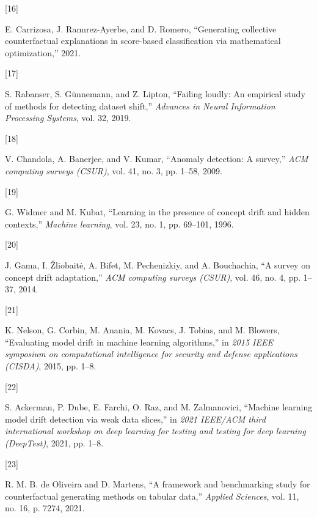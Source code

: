 \documentclass[
  conference]{IEEEtran}
\newlength{\cslhangindent}
\newlength{\csllabelwidth}
\newlength{\cslentryspacingunit} %
\newenvironment{CSLReferences}[2] %
 {%
  \setlength{\parindent}{0pt}
  \ifodd #1
  \let\oldpar\par
  \def\par{\hangindent=\cslhangindent\oldpar}
  \fi
  \setlength{\parskip}{#2\cslentryspacingunit}
 }%
 {}
\newcommand{\CSLLeftMargin}[1]{\parbox[t]{\csllabelwidth}{#1}}
\newcommand{\CSLRightInline}[1]{\parbox[t]{\linewidth - \csllabelwidth}{#1}\break}
\begin{document}
\begin{CSLReferences}{0}{0}
\leavevmode{}%
\CSLLeftMargin{{[}16{]} }%
\CSLRightInline{E. Carrizosa, J. Ramırez-Ayerbe, and D. Romero,
{``Generating collective counterfactual explanations in score-based
classification via mathematical optimization,''} 2021.}

\leavevmode{}%
\CSLLeftMargin{{[}17{]} }%
\CSLRightInline{S. Rabanser, S. Günnemann, and Z. Lipton, {``Failing
loudly: An empirical study of methods for detecting dataset shift,''}
\emph{Advances in Neural Information Processing Systems}, vol. 32,
2019.}

\leavevmode{}%
\CSLLeftMargin{{[}18{]} }%
\CSLRightInline{V. Chandola, A. Banerjee, and V. Kumar, {``Anomaly
detection: A survey,''} \emph{ACM computing surveys (CSUR)}, vol. 41,
no. 3, pp. 1--58, 2009.}

\leavevmode{}%
\CSLLeftMargin{{[}19{]} }%
\CSLRightInline{G. Widmer and M. Kubat, {``Learning in the presence of
concept drift and hidden contexts,''} \emph{Machine learning}, vol. 23,
no. 1, pp. 69--101, 1996.}

\leavevmode{}%
\CSLLeftMargin{{[}20{]} }%
\CSLRightInline{J. Gama, I. Žliobaitė, A. Bifet, M. Pechenizkiy, and A.
Bouchachia, {``A survey on concept drift adaptation,''} \emph{ACM
computing surveys (CSUR)}, vol. 46, no. 4, pp. 1--37, 2014.}

\leavevmode{}%
\CSLLeftMargin{{[}21{]} }%
\CSLRightInline{K. Nelson, G. Corbin, M. Anania, M. Kovacs, J. Tobias,
and M. Blowers, {``Evaluating model drift in machine learning
algorithms,''} in \emph{2015 IEEE symposium on computational
intelligence for security and defense applications (CISDA)}, 2015, pp.
1--8.}

\leavevmode{}%
\CSLLeftMargin{{[}22{]} }%
\CSLRightInline{S. Ackerman, P. Dube, E. Farchi, O. Raz, and M.
Zalmanovici, {``Machine learning model drift detection via weak data
slices,''} in \emph{2021 IEEE/ACM third international workshop on deep
learning for testing and testing for deep learning (DeepTest)}, 2021,
pp. 1--8.}

\leavevmode{}%
\CSLLeftMargin{{[}23{]} }%
\CSLRightInline{R. M. B. de Oliveira and D. Martens, {``A framework and
benchmarking study for counterfactual generating methods on tabular
data,''} \emph{Applied Sciences}, vol. 11, no. 16, p. 7274, 2021.}


\end{CSLReferences}
\end{document}
